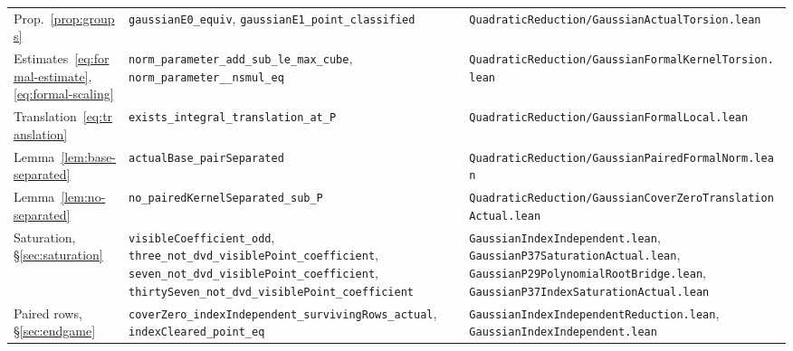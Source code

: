 \documentclass[10pt]{article}
\theoremstyle{definition}
\theoremstyle{remark}
\begin{document}
\begin{small}
\begin{longtable}{@{}p{3.6cm}p{6.3cm}p{5.4cm}@{}}
Prop.~\ref{prop:groups} & \texttt{gaussian\allowbreak E0\_\allowbreak equiv}, \texttt{gaussian\allowbreak E1\_\allowbreak point\_\allowbreak classified} & \texttt{Quadratic\allowbreak Reduction/\allowbreak Gaussian\allowbreak Actual\allowbreak Torsion.\allowbreak lean}\\
Estimates~\eqref{eq:formal-estimate}, \eqref{eq:formal-scaling} & \texttt{norm\_\allowbreak parameter\_\allowbreak add\_\allowbreak sub\_\allowbreak le\_\allowbreak max\_\allowbreak cube}, \texttt{norm\_\allowbreak parameter\_\allowbreak 37\_\allowbreak nsmul\_\allowbreak eq} & \texttt{Quadratic\allowbreak Reduction/\allowbreak Gaussian\allowbreak Formal\allowbreak Kernel\allowbreak Torsion.\allowbreak lean}\\
Translation~\eqref{eq:translation} & \texttt{exists\_\allowbreak integral\_\allowbreak translation\_\allowbreak at\_\allowbreak P} & \texttt{Quadratic\allowbreak Reduction/\allowbreak Gaussian\allowbreak Formal\allowbreak Local.\allowbreak lean}\\
Lemma~\ref{lem:base-separated} & \texttt{actual\allowbreak Base\_\allowbreak pair\allowbreak Separated} & \texttt{Quadratic\allowbreak Reduction/\allowbreak Gaussian\allowbreak Paired\allowbreak Formal\allowbreak Norm.\allowbreak lean}\\
Lemma~\ref{lem:no-separated} & \texttt{no\_\allowbreak paired\allowbreak Kernel\allowbreak Separated\_\allowbreak sub\_\allowbreak P} & \texttt{Quadratic\allowbreak Reduction/\allowbreak Gaussian\allowbreak Cover\allowbreak Zero\allowbreak Translation\allowbreak Actual.\allowbreak lean}\\
Saturation, \S\ref{sec:saturation} & \texttt{visible\allowbreak Coefficient\_\allowbreak odd}, \texttt{three\_\allowbreak not\_\allowbreak dvd\_\allowbreak visible\allowbreak Point\_\allowbreak coefficient}, \texttt{seven\_\allowbreak not\_\allowbreak dvd\_\allowbreak visible\allowbreak Point\_\allowbreak coefficient}, \texttt{thirty\allowbreak Seven\_\allowbreak not\_\allowbreak dvd\_\allowbreak visible\allowbreak Point\_\allowbreak coefficient} & \texttt{Gaussian\allowbreak Index\allowbreak Independent.\allowbreak lean}, \texttt{Gaussian\allowbreak P37\allowbreak Saturation\allowbreak Actual.\allowbreak lean}, \texttt{Gaussian\allowbreak P29\allowbreak Polynomial\allowbreak Root\allowbreak Bridge.\allowbreak lean}, \texttt{Gaussian\allowbreak P37\allowbreak Index\allowbreak Saturation\allowbreak Actual.\allowbreak lean}\\
Paired rows, \S\ref{sec:endgame} & \texttt{cover\allowbreak Zero\_\allowbreak index\allowbreak Independent\_\allowbreak surviving\allowbreak Rows\_\allowbreak actual}, \texttt{index\allowbreak Cleared\_\allowbreak point\_\allowbreak eq} & \texttt{Gaussian\allowbreak Index\allowbreak Independent\allowbreak Reduction.\allowbreak lean}, \texttt{Gaussian\allowbreak Index\allowbreak Independent.\allowbreak lean}\\

\end{longtable}
\end{small}
\end{document}
